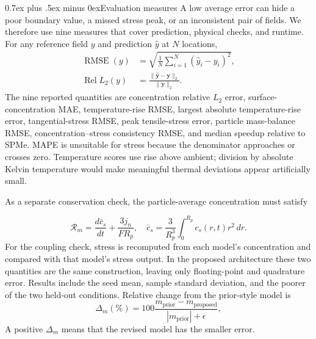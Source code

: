 \documentclass[conference]{IEEEtran}
\makeatletter
\newcommand{\headingfont}{\rmfamily}
\def\subsection{\@startsection{subsection}{2}{\z@}{1.5ex plus 1.5ex minus 0.5ex}%
{0.7ex plus .5ex minus 0ex}{\normalfont\headingfont\normalsize\bfseries}}
\makeatother
\begin{document}
\subsection{Evaluation measures}
A low average error can hide a poor boundary value, a missed stress peak, or an inconsistent pair of fields. We therefore use nine measures that cover prediction, physical checks, and runtime. For any reference field $y$ and prediction $\widehat y$ at $N$ locations,
\begin{align}
\operatorname{RMSE}(y)&=\sqrt{\frac{1}{N}\sum_{i=1}^{N}(\widehat y_i-y_i)^2},
\label{eq:rmse}\\
\operatorname{Rel}L_2(y)&=\frac{\|\widehat{\mathbf y}-\mathbf y\|_2}{\|\mathbf y\|_2}.
\label{eq:rell2}
\end{align}
The nine reported quantities are concentration relative $L_2$ error, surface-concentration MAE, temperature-rise RMSE, largest absolute temperature-rise error, tangential-stress RMSE, peak tensile-stress error, particle mass-balance RMSE, concentration--stress consistency RMSE, and median speedup relative to SPMe. MAPE is unsuitable for stress because the denominator approaches or crosses zero. Temperature scores use rise above ambient; division by absolute Kelvin temperature would make meaningful thermal deviations appear artificially small.

As a separate conservation check, the particle-average concentration must satisfy

\begin{equation}
\mathcal{R}_{m}=\frac{d\bar c_s}{dt}+\frac{3j_n}{FR_p},\quad
\bar c_s=\frac{3}{R_p^3}\int_0^{R_p}c_s(r,t)r^2\,dr.
\label{eq:mass}
\end{equation}
For the coupling check, stress is recomputed from each model's concentration and compared with that model's stress output. In the proposed architecture these two quantities are the same construction, leaving only floating-point and quadrature error. Results include the seed mean, sample standard deviation, and the poorer of the two held-out conditions. Relative change from the prior-style model is
\begin{equation}
\Delta_m(\%)=100\frac{m_{\mathrm{prior}}-m_{\mathrm{proposed}}}
{|m_{\mathrm{prior}}|+\epsilon},
\label{eq:gap}
\end{equation}
A positive $\Delta_m$ means that the revised model has the smaller error.
\end{document}
